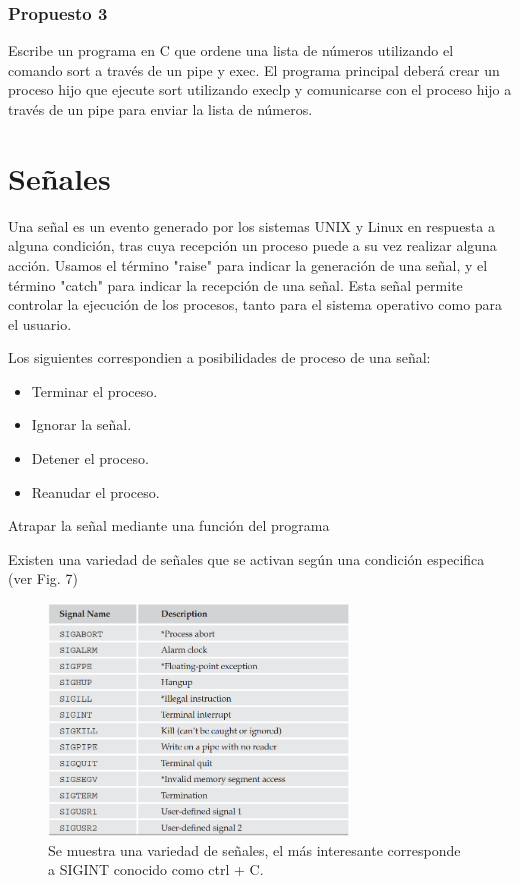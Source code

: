 \documentclass[journal]{IEEEtai}
\begin{document}
\subsubsection{\textbf{Propuesto 3}} Escribe un programa en C que ordene una lista de números utilizando el comando sort a través de un pipe y exec. El programa principal deberá crear un proceso hijo que ejecute sort utilizando execlp y comunicarse con el proceso hijo a través de un pipe para enviar la lista de números.

 \section{Señales}
 
Una señal es un evento generado por los sistemas UNIX y Linux en respuesta a alguna condición, tras cuya recepción un proceso puede a su vez realizar alguna acción. Usamos el término "raise" para indicar la generación de una señal, y el término "catch" para indicar la recepción de una señal. Esta señal permite controlar la ejecución de los procesos, tanto para el sistema operativo como para el usuario.

Los siguientes correspondien a posibilidades de proceso de una señal:
\begin{itemize}
\item	Terminar el proceso.
\item	Ignorar la señal.
\item	Detener el proceso.
\item	Reanudar el proceso.
\end{itemize}

Atrapar la señal mediante una función del programa

Existen una variedad de señales que se activan según una condición especifica (ver Fig. 7)
\begin{figure}[h!]
\centering
\includegraphics[width=8cm]{img/signal.png}
\caption{Se muestra una variedad de señales, el más interesante corresponde a SIGINT conocido como ctrl + C.}
\label{fig}
\end{figure}
\end{document}
